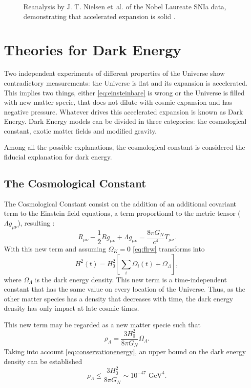 \begin{figure}
\begin{center}
\caption{Reanalysis by J. T. Nielsen et~al. of the Nobel Laureate SNIa data, demonstrating that accelerated expansion is solid \cite{2016NatSR...635596N}.}
\label{fig:sarkar_SNIa}
\end{center}
\end{figure}

\section{Theories for Dark Energy}
Two independent experiments of different properties of the Universe show contradictory measurements: the Universe is flat and its expansion is accelerated. This implies two things, either \autoref{eq:einsteinbare} is wrong or the Universe is filled with new matter specie, that does not dilute with cosmic expansion and has negative pressure. Whatever drives this accelerated expansion is known as Dark Energy. Dark Energy models can be divided in three categories: the cosmological constant, exotic matter fields and modified gravity.
\newline

Among all the possible explanations, the cosmological constant is considered the fiducial explanation for dark energy.

\subsection{The Cosmological Constant}
The Cosmological Constant \cite{1917SPAW.......142E} consist on the addition of an additional covariant term to the Einstein field equations, a term proportional to the metric tensor ($\Lambda g_{\mu\nu}$), resulting \cite{2001LRR.....4....1C}:
\begin{equation}
R_{\mu\nu}-\frac{1}{2}Rg_{\mu\nu}+\Lambda g_{\mu\nu} = \frac{8\pi G_N}{c^4}T_{\mu\nu}.
\end{equation}
With this new term and assuming $\Omega_K=0$ \autoref{eq:flrw} transforms into
\begin{equation}
H^2(t) = H_0^2\left[\sum_i\Omega_i(t) +\Omega_\Lambda\right],
\end{equation}
where $\Omega_\Lambda$ is the dark energy density. This new term is a time-independent constant that has the same value on every location of the Universe. Thus, as the other matter species has a density that decreases with time, the dark energy density has only impact at late cosmic times.
\newline

This new term may be regarded as a new matter specie such that
\begin{equation}
\rho_\Lambda = \frac{3H_0^2}{8\pi G_N}\Omega_\Lambda.
\end{equation}
Taking into account \autoref{eq:conservationenergy}, an upper bound on the dark energy density can be established
\begin{equation}
\rho_\Lambda \leq \frac{3H_0^2}{8\pi G_N} \sim 10 ^{-47} \mbox{ GeV}^4.
\label{eq:cosmologicalconstant}
\end{equation}
\newline

